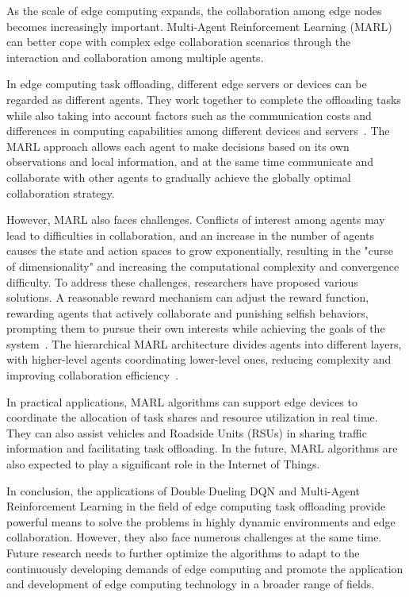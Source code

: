 \documentclass[journal]{IEEEtran}
\begin{document}
As the scale of edge computing expands, the collaboration among edge nodes becomes increasingly important. Multi-Agent Reinforcement Learning (MARL) can better cope with complex edge collaboration scenarios through the interaction and collaboration among multiple agents.

In edge computing task offloading, different edge servers or devices can be regarded as different agents. They work together to complete the offloading tasks while also taking into account factors such as the communication costs and differences in computing capabilities among different devices and servers~\cite{9485089}. The MARL approach allows each agent to make decisions based on its own observations and local information, and at the same time communicate and collaborate with other agents to gradually achieve the globally optimal collaboration strategy.

However, MARL also faces challenges. Conflicts of interest among agents may lead to difficulties in collaboration, and an increase in the number of agents causes the state and action spaces to grow exponentially, resulting in the "curse of dimensionality" and increasing the computational complexity and convergence difficulty. To address these challenges, researchers have proposed various solutions. A reasonable reward mechanism can adjust the reward function, rewarding agents that actively collaborate and punishing selfish behaviors, prompting them to pursue their own interests while achieving the goals of the system~\cite{9126253}. The hierarchical MARL architecture divides agents into different layers, with higher-level agents coordinating lower-level ones, reducing complexity and improving collaboration efficiency~\cite{9477423}.

In practical applications, MARL algorithms can support edge devices to coordinate the allocation of task shares and resource utilization in real time. They can also assist vehicles and Roadside Units (RSUs) in sharing traffic information and facilitating task offloading. In the future, MARL algorithms are also expected to play a significant role in the Internet of Things.

In conclusion, the applications of Double Dueling DQN and Multi-Agent Reinforcement Learning in the field of edge computing task offloading provide powerful means to solve the problems in highly dynamic environments and edge collaboration. However, they also face numerous challenges at the same time. Future research needs to further optimize the algorithms to adapt to the continuously developing demands of edge computing and promote the application and development of edge computing technology in a broader range of fields.
\end{document}
